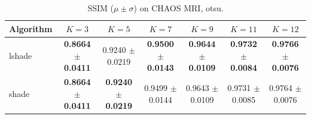 \begin{table}[htbp]
\centering
\caption{SSIM ($\mu \pm \sigma$) on CHAOS MRI, otsu.}
\label{tab:exp2-otsu-ssim}
\begin{tabular}{lcccccc}
\toprule
Algorithm & $K=3$ & $K=5$ & $K=7$ & $K=9$ & $K=11$ & $K=12$ \\
\midrule
lshade & \textbf{0.8664 $\pm$ 0.0411} & 0.9240 $\pm$ 0.0219 & \textbf{0.9500 $\pm$ 0.0143} & \textbf{0.9644 $\pm$ 0.0109} & \textbf{0.9732 $\pm$ 0.0084} & \textbf{0.9766 $\pm$ 0.0076} \\
shade & \textbf{0.8664 $\pm$ 0.0411} & \textbf{0.9240 $\pm$ 0.0219} & 0.9499 $\pm$ 0.0144 & 0.9643 $\pm$ 0.0109 & 0.9731 $\pm$ 0.0085 & 0.9764 $\pm$ 0.0076 \\
\bottomrule
\end{tabular}
\end{table}